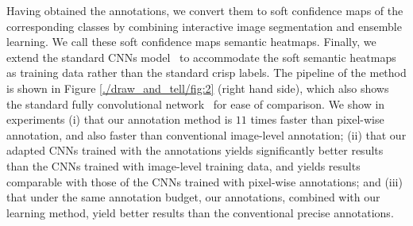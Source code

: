 

Having obtained the annotations, we convert them to soft confidence
maps of the corresponding classes by combining interactive image
segmentation and ensemble learning. We call these soft confidence maps semantic heatmaps.
Finally, we extend the standard CNNs model~\citep{Long_2015_CVPR} to
accommodate the soft semantic heatmaps as training data rather than the
standard crisp labels.  The pipeline of the method is shown in
Figure \ref{./draw_and_tell/fig:2} (right hand side), which also shows the standard fully
convolutional network~\citep{Long_2015_CVPR} for ease of comparison. We
show in experiments (i) that our annotation method is $11$ times faster than
pixel-wise annotation, and also faster than
conventional image-level annotation; (ii) that our adapted CNNs trained with the
annotations yields significantly better results than the CNNs trained
with image-level training data, and yields results comparable with
those of the CNNs trained with pixel-wise annotations; and (iii) that under the same annotation budget, our annotations, combined with our learning method, yield better results than the conventional precise annotations.
 
